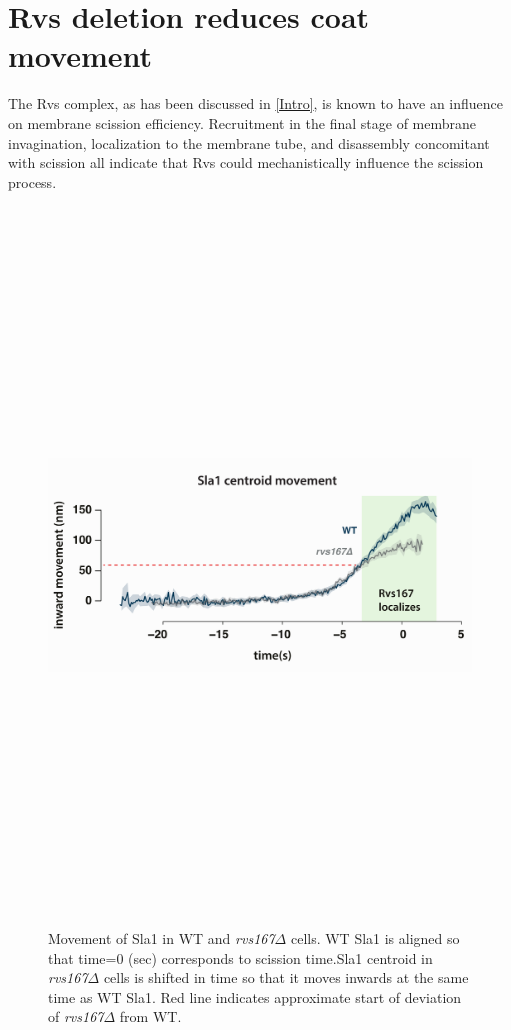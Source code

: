 

\section{Rvs deletion reduces coat movement}
\label{sec:rvsdel}
The Rvs complex, as has been discussed in \ref{Intro}, is known to have an influence on membrane scission efficiency. Recruitment in the final stage of membrane invagination, localization to the membrane tube, and disassembly concomitant with scission all indicate that Rvs could mechanistically influence the scission process.


	\vspace{1mm}
	
	\begin{figure}[H]
		\centering
		\includegraphics[width=14cm,height=19cm, keepaspectratio, valign=t]{figures/results_final/rvsdeletion3}
		\caption[Coat movement in \textit{rvs167$\Delta$} cells]
		{Movement of Sla1 in WT and  \textit{rvs167$\Delta$} cells. WT Sla1 is aligned so that time=0 (sec) corresponds to scission time.Sla1 centroid  in \textit{rvs167$\Delta$} cells is shifted in time so that it moves inwards at the same time as WT Sla1. Red line indicates approximate start of deviation of \textit{rvs167$\Delta$} from WT. 
			\label{fig2_rvsdelta}
		}
	\end{figure}



